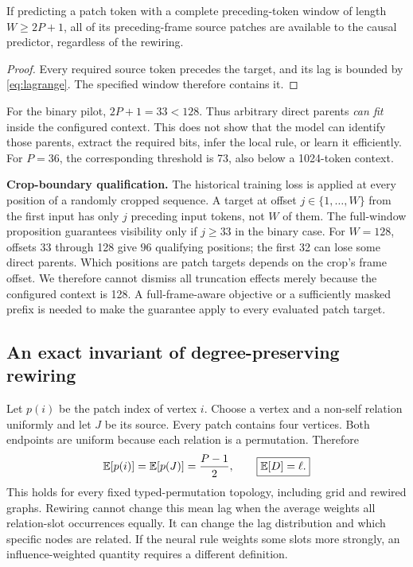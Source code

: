 \begin{proposition}
If predicting a patch token with a complete preceding-token window of
length $W\geq2P+1$, all of its preceding-frame source patches are
available to the causal predictor, regardless of the rewiring.
\end{proposition}
\begin{proof}
Every required source token precedes the target, and its lag is bounded
by \eqref{eq:lagrange}. The specified window therefore contains it.
\end{proof}

For the binary pilot, $2P+1=33<128$. Thus arbitrary direct parents
\emph{can fit} inside the configured context. This does not show that
the model can identify those parents, extract the required bits, infer
the local rule, or learn it efficiently. For $P=36$, the corresponding
threshold is 73, also below a 1024-token context.

\textbf{Crop-boundary qualification.}
The historical training loss is applied at every position of a randomly
cropped sequence. A target at offset $j\in\{1,\ldots,W\}$ from the first
input has only $j$ preceding input tokens, not $W$ of them. The full-window
proposition guarantees visibility only if $j\geq33$ in the binary case.
For $W=128$, offsets 33 through 128 give $96$ qualifying positions;
the first 32 can lose some direct parents. Which positions are patch
targets depends on the crop's frame offset. We therefore cannot dismiss
all truncation effects merely because the configured context is 128.
A full-frame-aware objective or a sufficiently masked prefix is needed
to make the guarantee apply to every evaluated patch target.

\subsection{An exact invariant of degree-preserving rewiring}

Let $p(i)$ be the patch index of vertex $i$. Choose a vertex and a
non-self relation uniformly and let $J$ be its source. Every patch contains
four vertices. Both endpoints are uniform because each relation is a
permutation. Therefore
\begin{equation}
 \mathbb{E}[p(i)]=\mathbb{E}[p(J)]=\frac{P-1}{2},
 \qquad \boxed{\mathbb{E}[D]=\ell.}
 \label{eq:meanlag}
\end{equation}
This holds for every fixed typed-permutation topology, including grid
and rewired graphs. Rewiring cannot change this mean lag when the
average weights all relation-slot occurrences equally.
It can change the lag distribution and which specific nodes are related.
If the neural rule weights some slots more strongly, an influence-weighted
quantity requires a different definition.


